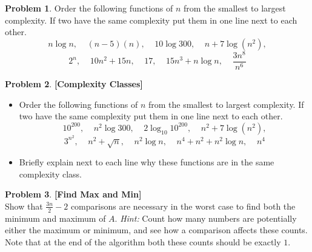 \documentclass{article}
\theoremstyle{definition}
\newtheorem{Q}{Problem}
\begin{document}
\begin{Q} 
Order the following functions of $n$ from the smallest to largest complexity. If two have the same complexity put them in one line next to each other. 
$$n\log n, \;\;\;\; (n-5)(n), \;\;\;\; 10\log 300, \;\;\;\;   n+7\log(n^2),$$ $$ 2^n, \;\;\;\; 10n^2+15n,\;\;\;\;   17,\;\;\;\;15n^3+n\log n,\;\;\;\;\frac{3n^8}{n^6}$$
\end{Q}


\begin{Q}
\textbf{[Complexity Classes]}
\begin{itemize}
\item Order the following functions of $n$ from the smallest to largest complexity. If two have the same complexity put them in one line next to each other. 
$$10^{200}, \;\;\;\; n^2\log 300, \;\;\;\; 2\log_{10} 10^{200}, \;\;\;\;   n^2+7\log(n^2),$$ $$ 3^{n^2}, \;\;\;\; n^2+\sqrt{n},\;\;\;\; n^2\log n  ,\;\;\;\;n^4+n^2+n^2\log n,\;\;\;\; n^4$$
\item Briefly explain next to each line why these functions are in the same complexity class.

\vskip0.07in
\noindent\makebox[\linewidth]{\rule{\textwidth}{0.3pt}} 
\vskip0.07in
\noindent\makebox[\linewidth]{\rule{\textwidth}{0.2pt}} 
\vskip0.07in
\noindent\makebox[\linewidth]{\rule{\textwidth}{0.2pt}} 
\vskip0.07in
\noindent\makebox[\linewidth]{\rule{\textwidth}{0.2pt}} 
\vskip0.07in
\noindent\makebox[\linewidth]{\rule{\textwidth}{0.2pt}} 
\vskip0.07in
\noindent\makebox[\linewidth]{\rule{\textwidth}{0.2pt}} 
\vskip0.07in
\noindent\makebox[\linewidth]{\rule{\textwidth}{0.2pt}} 
\vskip0.07in
\noindent\makebox[\linewidth]{\rule{\textwidth}{0.2pt}} 
\end{itemize}
\end{Q}

\begin{Q} 
\textbf{[Find Max and Min]}\\
Show that $\frac{3n}{2} - 2$ comparisons are necessary in the worst case to find both the minimum and maximum of $A$. {\em Hint:} Count how many numbers are potentially either the maximum or minimum, and see how a comparison affects these counts. Note that at the end of the algorithm both these counts should be exactly $1$.
\end{Q}
\end{document}
